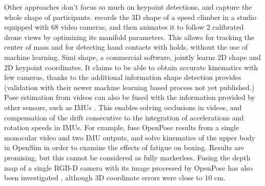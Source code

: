 Other approaches don't focus so much on keypoint detections, and capture the whole shape of participants. \cite{Reveret2020} records the 3D shape of a speed climber in a studio equipped with 68 video cameras, and then animates it to follow 2 calibrated drone views by optimizing its manifold parameters. This allows for tracking the center of mass and for detecting hand contacts with holds, without the use of machine learning. Simi shape, a commercial software, jointly learns 2D shape and 2D keypoint coordinates. It claims to be able to obtain accurate kinematics with few cameras, thanks to the additional information shape detection provides (validation with their newer machine learning based process not yet published.) Pose estimation from videos can also be fused with the information provided by other sensors, such as IMUs \cite{Bao2022, Zhang2020}. This enables solving occlusions in videos, and compensation of the drift consecutive to the integration of accelerations and rotation speeds in IMUs. For example, \cite{Haralabidis2020} fuse OpenPose results from a single monocular video and two IMU outputs, and solve kinematics of the upper body in OpenSim in order to examine the effects of fatigue on boxing. Results are promising, but this cannot be considered as fully markerless. Fusing the depth map of a single RGB-D camera with its image processed by OpenPose has also been investigated \cite{Liu2022c}, although 3D coordinate errors were close to 10 cm.


